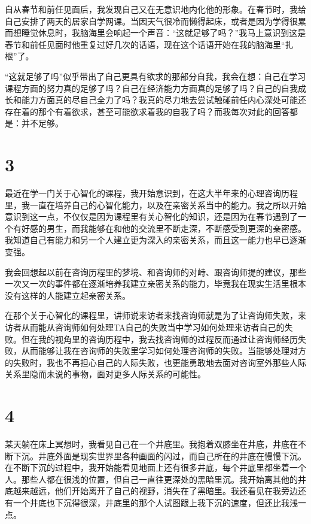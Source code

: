 自从春节和前任见面后，我发现自己又在无意识地内化他的形象。在春节时，我给自己安排了两天的居家自学网课。当因天气很冷而懒得起床，或者是因为学得很累而想睡觉休息时，我脑海里会响起一个声音：“这就足够了吗？”我马上意识到这是春节和前任见面时他重复过好几次的话语，现在这个话语开始在我的脑海里“扎根”了。

“这就足够了吗”似乎带出了自己更具有欲求的那部分自我，我会在想：自己在学习课程方面的努力真的足够了吗？自己在经济能力方面真的足够了吗？自己的自我成长和能力方面真的尽自己全力了吗？我真的尽力地去尝试触碰前任内心深处可能还存在着的那个有着欲求，甚至可能欲求着我的自我了吗？而我每次对此的回答都是：并不足够。


\section*{3}

最近在学一门关于心智化的课程，我开始意识到，在这大半年来的心理咨询历程里，我一直在培养自己的心智化能力，以及在亲密关系当中的能力。我之所以开始意识到这一点，不仅仅是因为课程里有关心智化的知识，还是因为在春节遇到了一个有好感的男生，而我能够在和他的交流里不断走深，不断感受到更深的亲密感。我知道自己有能力和另一个人建立更为深入的亲密关系，而且这一能力也早已逐渐变强。

我会回想起以前在咨询历程里的梦境、和咨询师的对峙、跟咨询师提的建议，那些一次又一次的事件都在逐渐培养我建立亲密关系的能力，毕竟我在现实生活里根本没有这样的人能建立起亲密关系。

在那个关于心智化的课程里，讲师说来访者来找咨询师就是为了让咨询师失败，来访者从而能从咨询师如何处理TA自己的失败当中学习如何处理来访者自己的失败。但在我的视角里的咨询历程中，我去找咨询师的过程反而通过让咨询师经历失败，从而能够让我在咨询师的失败里学习如何处理咨询师的失败。当能够处理对方的失败时，我也不再担心自己的人际失败，也更能勇敢地去面对咨询室外那些人际关系里隐而未说的事物，面对更多人际关系的可能性。


\section*{4}

某天躺在床上冥想时，我看见自己在一个井底里。我抱着双膝坐在井底，井底在不断下沉。井底外面是现实世界里各种画面的闪过，而自己所在的井底在慢慢下沉。在不断下沉的过程中，我开始能看见地面上还有很多井底，每个井底里都坐着一个人。那些人都在很浅的位置，但自己一直往更深处的黑暗里沉。我开始离其他的井底越来越远，他们开始离开了自己的视野，消失在了黑暗里。我还看见在我旁边还有一个井底也下沉得很深，井底里的那个人试图跟上我下沉的速度，但还比我浅一点。

